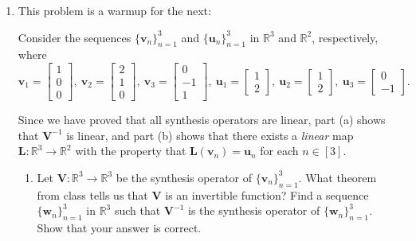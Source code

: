 \documentclass[12pt]{amsart}
\newcommand{\1}{\mathbbm{1}}
\numberwithin{equation}{section}
\numberwithin{Theorem}{section}
\theoremstyle{plain} %
\theoremstyle{definition}
\theoremstyle{remark}
\begin{document}
\thispagestyle{empty}

\bigskip





\begin{enumerate}[1.]

\item This problem is a warmup for the next:

Consider the sequences \(\{\mathbf{v}_{n}\}_{n=1}^{3}\) and \(\{\mathbf{u}_{n}\}_{n=1}^{3}\) in \(\mathbb{R}^{3}\) and \(\mathbb{R}^{2}\), respectively, where
\[\mathbf{v}_{1} = \begin{bmatrix} 1\\ 0\\ 0\end{bmatrix},\ \mathbf{v}_{2} = \begin{bmatrix} 2\\ 1\\ 0\end{bmatrix},\ \mathbf{v}_{3} = \begin{bmatrix} 0\\ -1\\ 1\end{bmatrix},\ \mathbf{u}_{1} = \begin{bmatrix} 1\\ 2\end{bmatrix},\ \mathbf{u}_{2} = \begin{bmatrix} 1\\ 2\end{bmatrix},\ \mathbf{u}_{3} = \begin{bmatrix} 0\\ -1\end{bmatrix}.\]

Since we have proved that all synthesis operators are linear, part (a) shows that \(\mathbf{V}^{-1}\) is linear, and part (b) shows that there exists a \textit{linear} map \(\mathbf{L}:\mathbb{R}^{3}\to\mathbb{R}^{2}\) with the property that \(\mathbf{L}(\mathbf{v}_{n}) = \mathbf{u}_{n}\) for each \(n\in[3]\).

\begin{enumerate}

\item Let \(\mathbf{V}:\mathbb{R}^{3}\to\mathbb{R}^{3}\) be the synthesis operator of \(\{\mathbf{v}_{n}\}_{n=1}^{3}\). What theorem from class tells us that \(\mathbf{V}\) is an invertible function? Find a sequence \(\{\mathbf{w}_{n}\}_{n=1}^{3}\) in \(\mathbb{R}^{3}\) such that \(\mathbf{V}^{-1}\) is the synthesis operator of \(\{\mathbf{w}_{n}\}_{n=1}^{3}\). Show that your answer is correct.


\end{enumerate}
\end{enumerate}
\end{document}
